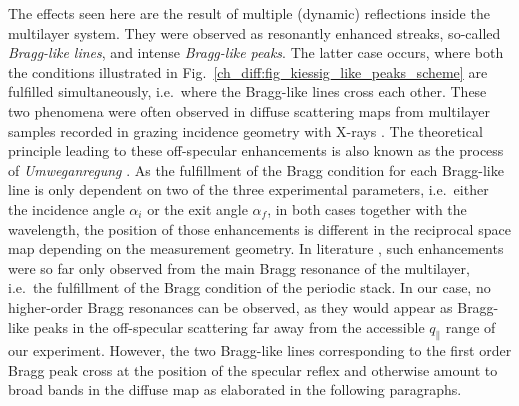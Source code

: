 The effects seen here are the result of multiple (dynamic) reflections inside the multilayer system. They were observed as resonantly enhanced streaks, so-called \emph{Bragg-like lines}, and intense \emph{Bragg-like peaks}. The latter case occurs, where both the conditions illustrated in Fig.~\ref{ch_diff:fig_kiessig_like_peaks_scheme} are fulfilled simultaneously, i.e.~where the Bragg-like lines cross each other. These two phenomena were often observed in diffuse scattering maps from multilayer samples recorded in grazing incidence geometry with X-rays  \cite{holy_nonspecular_1994}. The theoretical principle leading to these off-specular enhancements is also known as the process of \emph{Umweganregung} \cite{baumbach_influence_1994, baumbach_grazing-incidence_1995}. As the fulfillment of the Bragg condition for each Bragg-like line is only dependent on two of the three experimental parameters, i.e.~either the incidence angle $\alpha_i$ or the exit angle $\alpha_f$, in both cases together with the wavelength, the position of those enhancements is different in the reciprocal space map depending on the measurement geometry. In literature \cite{holy_nonspecular_1994, mikulik_x-ray_1997, baumbach_influence_1994, baumbach_grazing-incidence_1995}, such enhancements were so far only observed from the main Bragg resonance of the multilayer, i.e.~the fulfillment of the Bragg condition of the periodic stack. In our case, no higher-order Bragg resonances can be observed, as they would appear as Bragg-like peaks in the off-specular scattering far away from the accessible $q_\parallel$ range of our experiment. However, the two Bragg-like lines corresponding to the first order Bragg peak cross at the position of the specular reflex and otherwise amount to broad bands in the diffuse map as elaborated in the following paragraphs.

